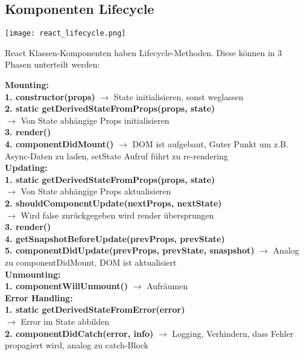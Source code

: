 \subsection{Komponenten Lifecycle}
\begin{minipage}{0.6\linewidth}
\texttt{[image: react\_lifecycle.png]}
\end{minipage}
\begin{minipage}{0.4\linewidth}
React Klassen-Komponenten haben Lifecycle-Methoden. Diese können in 3 Phasen unterteilt werden:
\end{minipage}
\textcolor{b}{\textbf{Mounting:}}\\
\textbf{1. constructor(props)} $\rightarrow$ State initialisieren, sonst weglassen\\
\textbf{2. static getDerivedStateFromProps(props, state)}\\
$\rightarrow$ Von State abhängige Props initialisieren\\
\textbf{3. render()}\\
\textbf{4. componentDidMount()} $\rightarrow$ DOM ist aufgebaut, Guter Punkt um z.B. Async-Daten zu laden, setState Aufruf führt zu re-rendering\\
\textcolor{b}{\textbf{Updating:}}\\
\textbf{1. static getDerivedStateFromProps(props, state)}\\
$\rightarrow$ Von State abhängige Props aktualisieren\\
\textbf{2. shouldComponentUpdate(nextProps, nextState)}\\
$\rightarrow$ Wird false zurückgegeben wird render übersprungen\\
\textbf{3. render()}\\
\textbf{4. getSnapshotBeforeUpdate(prevProps, prevState)}\\
\textbf{5. componentDidUpdate(prevProps, prevState, snaspshot)} $\rightarrow$ Analog zu componentDidMount, DOM ist aktualisiert\\
\textcolor{b}{\textbf{Unmounting:}}\\
\textbf{1. componentWillUnmount()} $\rightarrow$ Aufräumen\\
\textcolor{b}{\textbf{Error Handling:}}\\
\textbf{1. static getDerivedStateFromError(error)}\\
$\rightarrow$ Error im State abbilden\\
\textbf{2. componentDidCatch(error, info)} $\rightarrow$ Logging, Verhindern, dass Fehler propagiert wird, analog zu catch-Block
